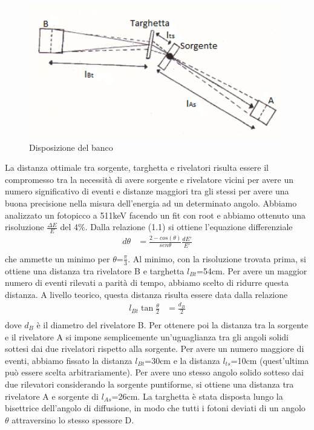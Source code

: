 \documentclass[italian,11pt]{report}
\begin{document}
\begin{figure}[htp]
\centering
\includegraphics[width=11cm]{apparato.png}
\caption{Disposizione del banco}
\end{figure}
La distanza ottimale tra sorgente, targhetta e rivelatori risulta essere il compromesso tra la necessità di avere sorgente e rivelatore vicini per avere un numero significativo di eventi e distanze maggiori tra gli stessi per avere una buona precisione nella misura dell'energia ad un determinato angolo. Abbiamo analizzato un fotopicco a 511keV facendo un fit con root e abbiamo ottenuto una risoluzione $\frac{\Delta E}{E}$ del 4$\%$.
Dalla relazione (1.1) si ottiene l'equazione differenziale
\vspace{0.5cm}
\begin{align*}
d\theta&=\frac{2-cos(\theta)}{sen\theta}\frac{dE'}{E'}\\
\end{align*}
che ammette un minimo per $\theta$=$\frac{\pi}{3}$. Al minimo, con la risoluzione trovata prima, si ottiene una distanza tra rivelatore B e targhetta $l_{Bt}$=54cm. Per avere un maggior numero di eventi rilevati a parità di tempo, abbiamo scelto di ridurre questa distanza. A livello teorico, questa distanza risulta essere data dalla relazione
\vspace{0.5cm}
\begin{align*}
l_{Bt}\tan\frac{\theta}{2}&=\frac{d_{B}}{2}\\
\end{align*}
dove $d_{B}$  è il diametro del rivelatore B. Per ottenere poi la distanza tra la sorgente e il rivelatore A si impone semplicemente un'uguaglianza tra gli angoli solidi sottesi dai due rivelatori rispetto alla sorgente. 
Per avere un numero maggiore di eventi, abbiamo fissato la distanza $l_{Bt}$=30cm e la distanza $l_{ts}$=10cm (quest'ultima può essere scelta arbitrariamente). Per avere uno stesso angolo solido sotteso dai due rilevatori considerando la sorgente puntiforme, si ottiene una distanza tra rivelatore A e sorgente di $l_{As}$=26cm. La targhetta è stata disposta lungo la bisettrice dell'angolo di diffusione, in modo che tutti i fotoni deviati di un angolo $\theta$ attraversino lo stesso spessore D.
\end{document}
